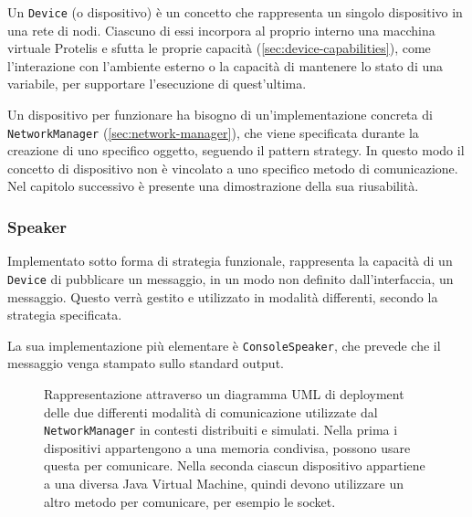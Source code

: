 Un \texttt{Device} (o dispositivo) è un concetto che rappresenta un singolo
dispositivo in una rete di nodi. Ciascuno di essi incorpora al proprio interno
una macchina virtuale Protelis e sfutta le proprie capacità
(\ref{sec:device-capabilities}), come l'interazione con l'ambiente esterno o la
capacità di mantenere lo stato di una variabile, per supportare l'esecuzione di
quest'ultima.

Un dispositivo per funzionare ha bisogno di un'implementazione concreta di
\texttt{NetworkManager} (\ref{sec:network-manager}), che viene specificata
durante la creazione di uno specifico oggetto, seguendo il pattern strategy. In questo modo il concetto di
dispositivo non è vincolato a uno specifico metodo di comunicazione. Nel
capitolo successivo è presente una dimostrazione della sua riusabilità.

\subsubsection{Speaker}
Implementato sotto forma di strategia funzionale, rappresenta la capacità di un
\texttt{Device} di pubblicare un messaggio, in un modo non definito dall'interfaccia, un
messaggio. Questo verrà gestito e utilizzato in modalità differenti, secondo
la strategia specificata.

La sua implementazione più elementare è \texttt{ConsoleSpeaker}, che prevede che
il messaggio venga stampato sullo standard output.
\begin{figure}
  \centering
  \hfill
  \caption{Rappresentazione attraverso un diagramma UML di deployment delle due
    differenti modalità di comunicazione utilizzate dal \texttt{NetworkManager}
    in contesti distribuiti e simulati. Nella prima i dispositivi appartengono a
    una memoria condivisa, possono usare questa per comunicare. Nella seconda
    ciascun dispositivo appartiene a una diversa Java Virtual Machine, quindi
    devono utilizzare un altro metodo per comunicare, per esempio le socket.}
\end{figure}